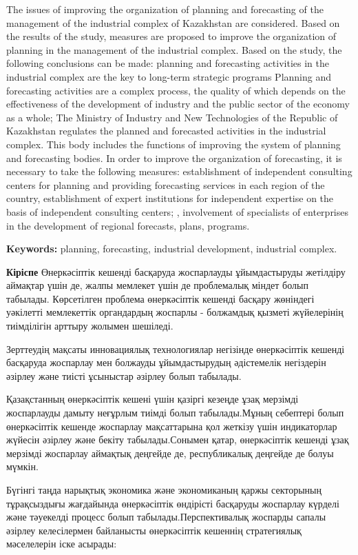 The issues of improving the organization of planning and forecasting of
the management of the industrial complex of Kazakhstan are considered.
Based on the results of the study, measures are proposed to improve the
organization of planning in the management of the industrial complex.
Based on the study, the following conclusions can be made: planning and
forecasting activities in the industrial complex are the key to
long-term strategic programs Planning and forecasting activities are a
complex process, the quality of which depends on the effectiveness of
the development of industry and the public sector of the economy as a
whole; The Ministry of Industry and New Technologies of the Republic of
Kazakhstan regulates the planned and forecasted activities in the
industrial complex. This body includes the functions of improving the
system of planning and forecasting bodies. In order to improve the
organization of forecasting, it is necessary to take the following
measures: establishment of independent consulting centers for planning
and providing forecasting services in each region of the country,
establishment of expert institutions for independent expertise on the
basis of independent consulting centers; , involvement of specialists of
enterprises in the development of regional forecasts, plans, programs.

{\bfseries Keywords:} planning, forecasting, industrial development,
industrial complex.

{\bfseries Кіріспе} Өнеркәсіптік кешенді басқаруда жоспарлауды
ұйымдастыруды жетілдіру аймақтар үшін де, жалпы мемлекет үшін де
проблемалық міндет болып табылады. Көрсетілген проблема өнеркәсіптік
кешенді басқару жөніндегі уәкілетті мемлекеттік органдардың жоспарлы -
болжамдық қызметі жүйелерінің тиімділігін арттыру жолымен шешіледі.

Зерттеудің мақсаты инновациялық технологиялар негізінде өнеркәсіптік
кешенді басқаруда жоспарлау мен болжауды ұйымдастырудың әдістемелік
негіздерін әзірлеу және тиісті ұсыныстар әзірлеу болып табылады.

Қазақстанның өнеркәсіптік кешені үшін қазіргі кезеңде ұзақ мерзімді
жоспарлауды дамыту неғұрлым тиімді болып табылады.Мұның себептері болып
өнеркәсіптік кешенде жоспарлау мақсаттарына қол жеткізу үшін
индикаторлар жүйесін әзірлеу және бекіту табылады.Сонымен қатар,
өнеркәсіптік кешенді ұзақ мерзімді жоспарлау аймақтық деңгейде де,
республикалық деңгейде де болуы мүмкін.

Бүгінгі таңда нарықтық экономика және экономиканың қаржы секторының
тұрақсыздығы жағдайында өнеркәсіптік өндірісті басқаруды жоспарлау
күрделі және тәуекелді процесс болып табылады.Перспективалық жоспарды
сапалы әзірлеу келесілермен байланысты өнеркәсіптік кешеннің
стратегиялық мәселелерін іске асырады:


